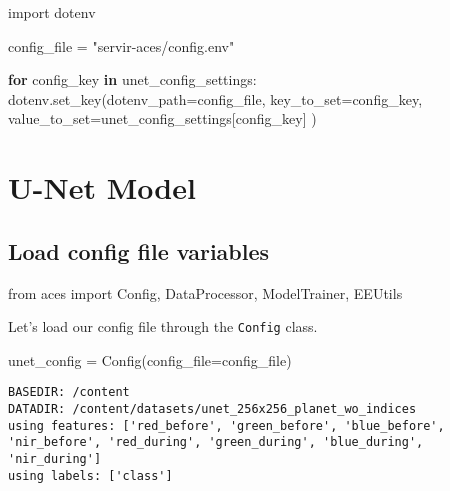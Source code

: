 \documentclass[
  letterpaper,
  DIV=11,
  numbers=noendperiod]{scrreprt}
\newenvironment{Shaded}{\begin{snugshade}}{\end{snugshade}}
\newcommand{\ControlFlowTok}[1]{\textcolor[rgb]{0.00,0.23,0.31}{\textbf{#1}}}
\newcommand{\ImportTok}[1]{\textcolor[rgb]{0.00,0.46,0.62}{#1}}
\newcommand{\KeywordTok}[1]{\textcolor[rgb]{0.00,0.23,0.31}{\textbf{#1}}}
\newcommand{\NormalTok}[1]{\textcolor[rgb]{0.00,0.23,0.31}{#1}}
\newcommand{\OperatorTok}[1]{\textcolor[rgb]{0.37,0.37,0.37}{#1}}
\newcommand{\StringTok}[1]{\textcolor[rgb]{0.13,0.47,0.30}{#1}}
\begin{document}
\begin{Shaded}
\begin{Highlighting}[]
\ImportTok{import}\NormalTok{ dotenv}

\NormalTok{config\_file }\OperatorTok{=} \StringTok{"servir{-}aces/config.env"}

\ControlFlowTok{for}\NormalTok{ config\_key }\KeywordTok{in}\NormalTok{ unet\_config\_settings:}
\NormalTok{    dotenv.set\_key(dotenv\_path}\OperatorTok{=}\NormalTok{config\_file,}
\NormalTok{                   key\_to\_set}\OperatorTok{=}\NormalTok{config\_key,}
\NormalTok{                   value\_to\_set}\OperatorTok{=}\NormalTok{unet\_config\_settings[config\_key]}
\NormalTok{                   )}
\end{Highlighting}
\end{Shaded}

\section{U-Net Model}\label{u-net-model}

\subsection{Load config file
variables}\label{load-config-file-variables}

\begin{Shaded}
\begin{Highlighting}[]
\ImportTok{from}\NormalTok{ aces }\ImportTok{import}\NormalTok{ Config, DataProcessor, ModelTrainer, EEUtils}
\end{Highlighting}
\end{Shaded}

Let's load our config file through the \texttt{Config} class.

\begin{Shaded}
\begin{Highlighting}[]
\NormalTok{unet\_config }\OperatorTok{=}\NormalTok{ Config(config\_file}\OperatorTok{=}\NormalTok{config\_file)}
\end{Highlighting}
\end{Shaded}

\begin{verbatim}
BASEDIR: /content
DATADIR: /content/datasets/unet_256x256_planet_wo_indices
using features: ['red_before', 'green_before', 'blue_before', 'nir_before', 'red_during', 'green_during', 'blue_during', 'nir_during']
using labels: ['class']
\end{verbatim}
\end{document}
